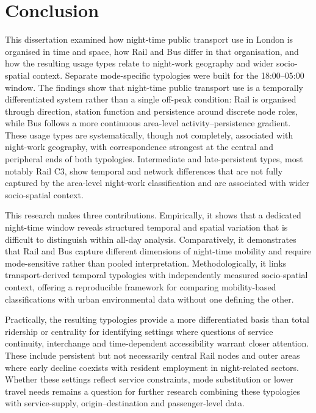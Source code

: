 \chapter{Conclusion}
\label{chapterlabel6}

This dissertation examined how night-time public transport use in London is organised in time and space, how Rail and Bus differ in that organisation, and how the resulting usage types relate to night-work geography and wider socio-spatial context. Separate mode-specific typologies were built for the 18:00--05:00 window. The findings show that night-time public transport use is a temporally differentiated system rather than a single off-peak condition: Rail is organised through direction, station function and persistence around discrete node roles, while Bus follows a more continuous area-level activity--persistence gradient. These usage types are systematically, though not completely, associated with night-work geography, with correspondence strongest at the central and peripheral ends of both typologies. Intermediate and late-persistent types, most notably Rail C3, show temporal and network differences that are not fully captured by the area-level night-work classification and are associated with wider socio-spatial context.

This research makes three contributions. Empirically, it shows that a dedicated night-time window reveals structured temporal and spatial variation that is difficult to distinguish within all-day analysis. Comparatively, it demonstrates that Rail and Bus capture different dimensions of night-time mobility and require mode-sensitive rather than pooled interpretation. Methodologically, it links transport-derived temporal typologies with independently measured socio-spatial context, offering a reproducible framework for comparing mobility-based classifications with urban environmental data without one defining the other.

Practically, the resulting typologies provide a more differentiated basis than total ridership or centrality for identifying settings where questions of service continuity, interchange and time-dependent accessibility warrant closer attention. These include persistent but not necessarily central Rail nodes and outer areas where early decline coexists with resident employment in night-related sectors. Whether these settings reflect service constraints, mode substitution or lower travel needs remains a question for further research combining these typologies with service-supply, origin--destination and passenger-level data.
